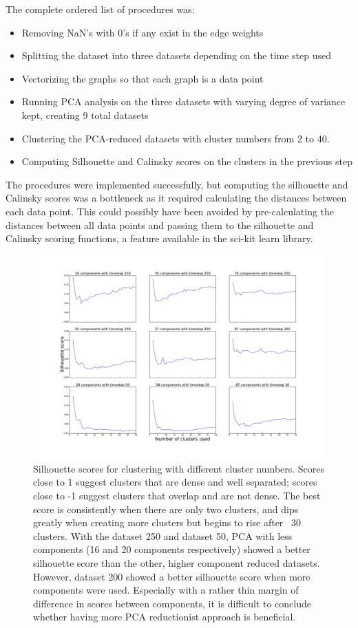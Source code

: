 \documentclass[journal,12pt,onecolumn,draftclsnofoot]{IEEEtran}  %
\begin{document}
The complete ordered list of procedures was:
\begin{itemize}
	\item Removing NaN's with 0's if any exist in the edge weights
	\item Splitting the dataset into three datasets depending on the time step used
	\item Vectorizing the graphs so that each graph is a data point
	\item Running PCA analysis on the three datasets with varying degree of variance kept, creating 9 total datasets
	\item Clustering the PCA-reduced datasets with cluster numbers from 2 to 40.
	\item Computing Silhouette and Calinsky scores on the clusters in the previous step
\end{itemize}

The procedures were implemented successfully, but computing the silhouette and Calinsky scores was a bottleneck as it required calculating the distances between each data point. This could possibly have been avoided by pre-calculating the distances between all data points and passing them to the silhouette and Calinsky scoring functions, a feature available in the sci-kit learn library.

\begin{figure}[H]
  \centering
  \includegraphics[width=\linewidth]{figures/silhouette_scores.pdf}
  \caption{Silhouette scores for clustering with different cluster numbers. Scores close to 1 suggest clusters that are dense and well separated; scores close to -1 suggest clusters that overlap and are not dense. The best score is consistently when there are only two clusters, and dips greatly when creating more clusters but begins to rise after ~30 clusters. With the dataset 250 and dataset 50, PCA with less components (16 and 20 components respectively) showed a better silhouette score than the other, higher component reduced datasets. However, dataset 200 showed a better silhouette score when more components were used. Especially with a rather thin margin of difference in scores between components, it is difficult to conclude whether having more PCA reductionist approach is beneficial.}
  \label{fig:silhouette_scores}
\end{figure}
\end{document}

